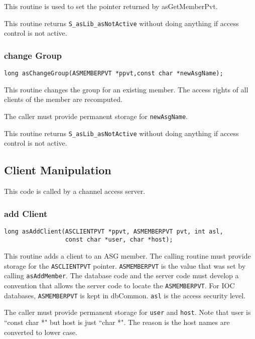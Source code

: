 This routine is used to set the pointer returned by asGetMemberPvt.

This routine returns \verb|S_asLib_asNotActive| without doing anything if access control is not active.

\subsubsection{change Group}

\begin{verbatim}
long asChangeGroup(ASMEMBERPVT *ppvt,const char *newAsgName);
\end{verbatim}
This routine changes the group for an existing member. The access rights of all clients of the member are recomputed.

The caller must provide permanent storage for \verb|newAsgName|.

This routine returns \verb|S_asLib_asNotActive| without doing anything if access control is not active.

\subsection{ Client Manipulation}

This code is called by a channel access server.

\subsubsection{add Client}

\begin{verbatim}
long asAddClient(ASCLIENTPVT *ppvt, ASMEMBERPVT pvt, int asl,
                 const char *user, char *host);
\end{verbatim}

This routine adds a client to an ASG member.
The calling routine must provide storage for the \verb|ASCLIENTPVT| pointer.
\verb|ASMEMBERPVT| is the value that was set by calling \verb|asAddMember|.
The database code and the server code must develop a convention that allows the server code to locate the \verb|ASMEMBERPVT|.
For IOC databases, \verb|ASMEMBERPVT| is kept in dbCommon.
\verb|asl| is the access security level.

The caller must provide permanent storage for \verb|user| and \verb|host|.
Note that user is ``const char *" but host is just ``char *".
The reason is the host names are converted to lower case.

